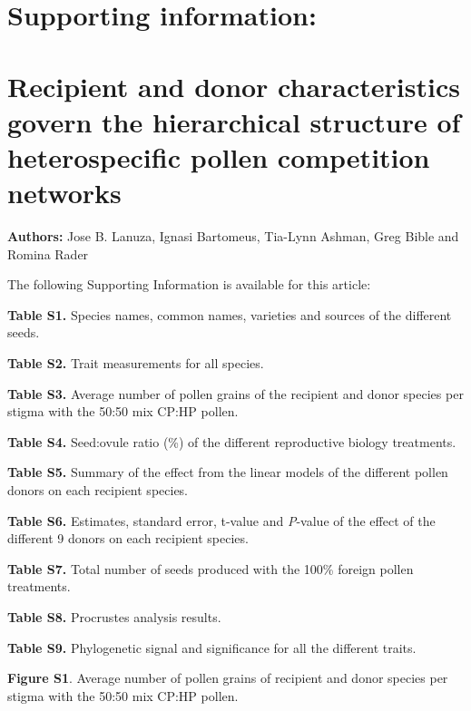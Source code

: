 \documentclass[
  12pt,
]{article}
\author{}
\date{\vspace{-2.5em}}
\begin{document}
\captionsetup[figure]{labelformat=empty}
\captionsetup[table]{labelformat=empty}
\renewcommand{\figurename}{}

\hypertarget{supporting-information}{%
\section{Supporting information:}\label{supporting-information}}

\hypertarget{recipient-and-donor-characteristics-govern-the-hierarchical-structure-of-heterospecific-pollen-competition-networks}{%
\section{Recipient and donor characteristics govern the hierarchical
structure of heterospecific pollen competition
networks}\label{recipient-and-donor-characteristics-govern-the-hierarchical-structure-of-heterospecific-pollen-competition-networks}}

\textbf{Authors:} Jose B. Lanuza, Ignasi Bartomeus, Tia-Lynn Ashman,
Greg Bible and Romina Rader

The following Supporting Information is available for this article:

\textbf{Table S1.} Species names, common names, varieties and sources of
the different seeds.

\textbf{Table S2.} Trait measurements for all species.

\textbf{Table S3.} Average number of pollen grains of the recipient and
donor species per stigma with the 50:50 mix CP:HP pollen.

\textbf{Table S4.} Seed:ovule ratio (\%) of the different reproductive
biology treatments.

\textbf{Table S5.} Summary of the effect from the linear models of the
different pollen donors on each recipient species.

\textbf{Table S6.} Estimates, standard error, t-value and \emph{P}-value
of the effect of the different 9 donors on each recipient species.

\textbf{Table S7.} Total number of seeds produced with the 100\% foreign
pollen treatments.

\textbf{Table S8.} Procrustes analysis results.

\textbf{Table S9.} Phylogenetic signal and significance for all the
different traits.

\textbf{Figure S1}. Average number of pollen grains of recipient and
donor species per stigma with the 50:50 mix CP:HP pollen.
\end{document}
